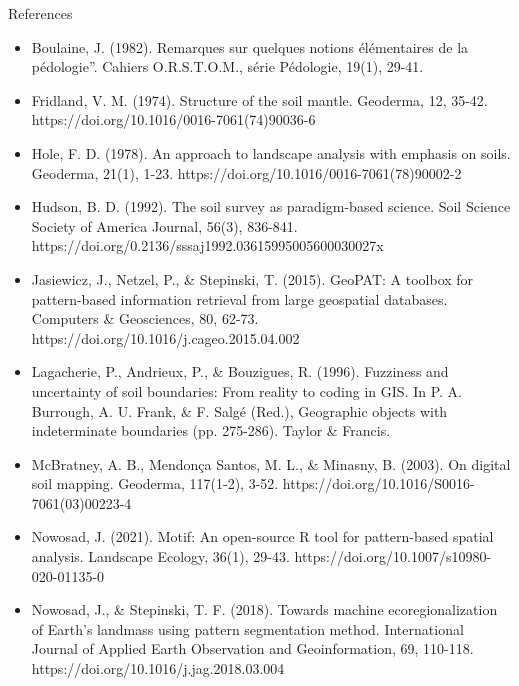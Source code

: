 \documentclass[aspectratio=169]{beamer}
\begin{document}
\begin{frame}[allowframebreaks]{References}
\begin{itemize}

    \item Boulaine, J. (1982). Remarques sur quelques notions élémentaires de la pédologie”. Cahiers O.R.S.T.O.M., série Pédologie, 19(1), 29-41.

    
    \item Fridland, V. M. (1974). Structure of the soil mantle. Geoderma, 12, 35-42. https://doi.org/10.1016/0016-7061(74)90036-6

    \item Hole, F. D. (1978). An approach to landscape analysis with emphasis on soils. Geoderma, 21(1), 1-23. https://doi.org/10.1016/0016-7061(78)90002-2

    \item Hudson, B. D. (1992). The soil survey as paradigm-based science. Soil Science Society of America Journal, 56(3), 836-841. https://doi.org/0.2136/sssaj1992.03615995005600030027x


    \item Jasiewicz, J., Netzel, P., \& Stepinski, T. (2015). GeoPAT: A toolbox for pattern-based information retrieval from large geospatial databases. Computers \& Geosciences, 80, 62-73. https://doi.org/10.1016/j.cageo.2015.04.002


    \item Lagacherie, P., Andrieux, P., \& Bouzigues, R. (1996). Fuzziness and uncertainty of soil boundaries: From reality to coding in GIS. In P. A. Burrough, A. U. Frank, \& F. Salgé (Red.), Geographic objects with indeterminate boundaries (pp. 275-286). Taylor \& Francis.

    \item McBratney, A. B., Mendon\c{c}a Santos, M. L., \& Minasny, B. (2003). On digital soil mapping. Geoderma, 117(1-2), 3-52. https://doi.org/10.1016/S0016-7061(03)00223-4

    \item Nowosad, J. (2021). Motif: An open-source R tool for pattern-based spatial analysis. Landscape Ecology, 36(1), 29-43. https://doi.org/10.1007/s10980-020-01135-0

    
    \item Nowosad, J., \& Stepinski, T. F. (2018). Towards machine ecoregionalization of Earth’s landmass using pattern segmentation method. International Journal of Applied Earth Observation and Geoinformation, 69, 110-118. https://doi.org/10.1016/j.jag.2018.03.004


\end{itemize}
\end{frame}
\end{document}
